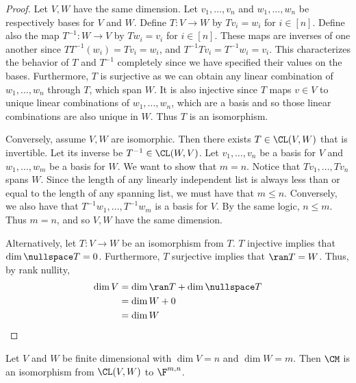 \documentclass{article}
\begin{document}
  \begin{proof}
    Let $V, W$ have the same dimension. Let $v_1, \dots, v_n$ and $w_1, \dots, w_n$ be respectively bases for $V$ and $W$. Define $T: V \to W$ by $Tv_i = w_i$ for $i \in [n]$. Define also
    the map $T^{-1}: W \to V$ by $Tw_i = v_i$ for $i \in [n]$. These maps are inverses of one another since $TT^{-1}(w_i) = Tv_i = w_i$, and $T^{-1}Tv_i = T^{-1}w_i = v_i$. This
    characterizes the behavior of $T$ and $T^{-1}$ completely since we have specified their values on the bases. Furthermore, $T$ is surjective as we can obtain any linear combination of
    $w_1, \dots, w_n$ through $T$, which span $W$. It is also injective since $T$ maps $v \in V$ to unique linear combinations of $w_1, \dots, w_n$, which are a basis and so those linear
    combinations are also unique in $W$. Thus $T$ is an isomorphism.

    Conversely, assume $V, W$ are isomorphic. Then there exists $T \in \CL(V, W)$ that is invertible. Let its inverse be $T^{-1} \in \CL(W, V)$. Let $v_1, \dots, v_n$ be a basis for $V$ and
    $w_1, \dots, w_m$ be a basis for $W$. We want to show that $m = n$. Notice that $Tv_1, \dots, Tv_n$ spans $W$. Since the length of any linearly independent list is always less than or
    equal to the length of any spanning list, we must have that $m \leq n$. Conversely, we also have that $T^{-1}w_1, \dots, T^{-1}w_m$ is a basis for $V$. By the same logic, $n \leq m$.
    Thus $m = n$, and so $V, W$ have the same dimension. 

    Alternatively, let $T: V \to W$ be an isomorphism from $T$. $T$ injective implies that $\dim\nullspace T = 0$. Furthermore, $T$ surjective implies that $\ran T = W$. Thus, by rank nullity,
    \begin{align*}
      \dim V & = \dim\ran T + \dim\nullspace T \\
      & = \dim W + 0 \\
      & = \dim W
    \end{align*}
  \end{proof}
  \begin{prop}
    Let $V$ and $W$ be finite dimensional with $\dim V = n$ and $\dim W = m$. Then $\CM$ is an isomorphism from $\CL(V, W)$ to $\F^{m, n}$.
  \end{prop}
\end{document}
